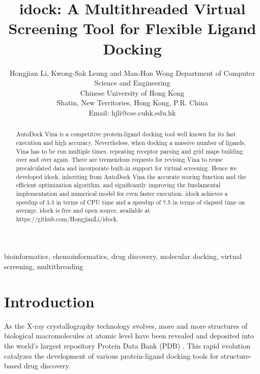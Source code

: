 \documentclass[10pt, conference, compsocconf]{IEEEtran}
\begin{document}
\title{idock: A Multithreaded Virtual Screening Tool for Flexible Ligand Docking} %
\author
{
\IEEEauthorblockN
{
Hongjian Li, Kwong-Sak Leung and Man-Hon Wong
\IEEEauthorblockA
{
Department of Computer Science and Engineering\\
Chinese University of Hong Kong\\
Shatin, New Territories, Hong Kong, P.R. China\\
Email: hjli@cse.cuhk.edu.hk
}
}
}
\maketitle

\begin{abstract}

AutoDock Vina is a competitive protein-ligand docking tool well known for its fast execution and high accuracy. Nevertheless, when docking a massive number of ligands, Vina has to be run multiple times, repeating receptor parsing and grid maps building over and over again. There are tremendous requests for revising Vina to reuse precalculated data and incorporate built-in support for virtual screening. Hence we developed idock, inheriting from AutoDock Vina the accurate scoring function and the efficient optimization algorithm, and significantly improving the fundamental implementation and numerical model for even faster execution. idock achieves a speedup of 3.3 in terms of CPU time and a speedup of 7.5 in terms of elapsed time on average. idock is free and open source, available at https://github.com/HongjianLi/idock.

\end{abstract}

\begin{IEEEkeywords}

bioinformatics, chemoinformatics, drug discovery, molecular docking, virtual screening, multithreading

\end{IEEEkeywords}

\section{Introduction}

As the X-ray crystallography technology evolves, more and more structures of biological macromolecules at atomic level have been revealed and deposited into the world's largest repository Protein Data Bank (PDB) \cite{539,537}. This rapid evolution catalyzes the development of various protein-ligand docking tools for structure-based drug discovery.
\end{document}
